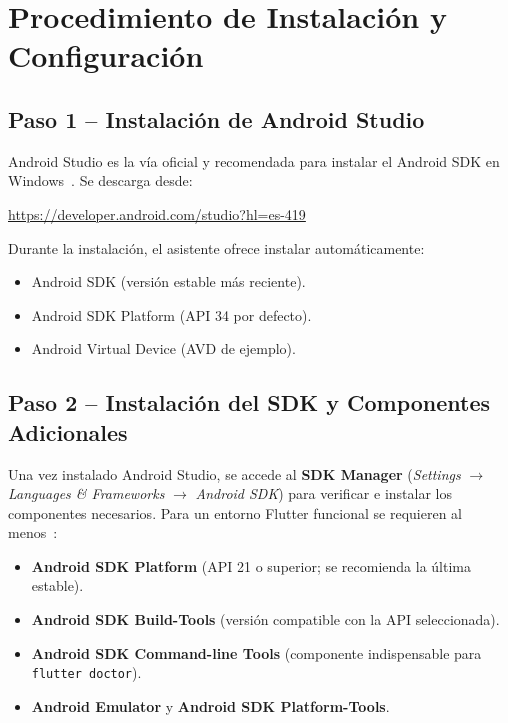 \documentclass[12pt,a4paper]{article}
\begin{document}
\section{Procedimiento de Instalación y Configuración}

\subsection{Paso 1 -- Instalación de Android Studio}

Android Studio es la vía oficial y recomendada para instalar el Android SDK en Windows~\cite{androidstudio2024}. Se descarga desde:

\begin{center}
  \url{https://developer.android.com/studio?hl=es-419}
\end{center}

Durante la instalación, el asistente ofrece instalar automáticamente:
\begin{itemize}
  \item Android SDK (versión estable más reciente).
  \item Android SDK Platform (API 34 por defecto).
  \item Android Virtual Device (AVD de ejemplo).
\end{itemize}

\subsection{Paso 2 -- Instalación del SDK y Componentes Adicionales}

Una vez instalado Android Studio, se accede al \textbf{SDK Manager} (\textit{Settings} $\to$ \textit{Languages \& Frameworks} $\to$ \textit{Android SDK}) para verificar e instalar los componentes necesarios. Para un entorno Flutter funcional se requieren al menos~\cite{flutter2024}:

\begin{itemize}
  \item \textbf{Android SDK Platform} (API 21 o superior; se recomienda la última estable).
  \item \textbf{Android SDK Build-Tools} (versión compatible con la API seleccionada).
  \item \textbf{Android SDK Command-line Tools} (componente indispensable para \texttt{flutter doctor}).
  \item \textbf{Android Emulator} y \textbf{Android SDK Platform-Tools}.
\end{itemize}
\end{document}
